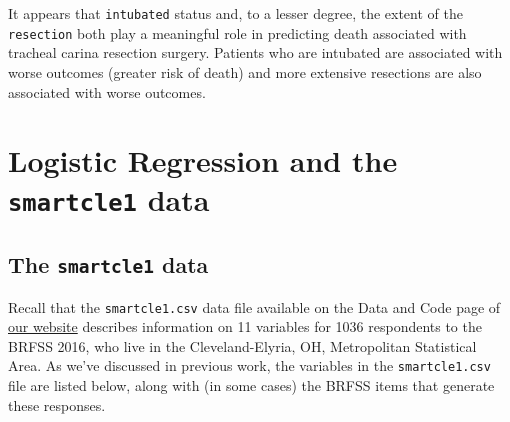 \documentclass[]{book}
\theoremstyle{definition}
\theoremstyle{definition}
\theoremstyle{definition}
\theoremstyle{remark}
\begin{document}
It appears that \texttt{intubated} status and, to a lesser degree, the
extent of the \texttt{resection} both play a meaningful role in
predicting death associated with tracheal carina resection surgery.
Patients who are intubated are associated with worse outcomes (greater
risk of death) and more extensive resections are also associated with
worse outcomes.

\chapter{\texorpdfstring{Logistic Regression and the \texttt{smartcle1}
data}{Logistic Regression and the smartcle1 data}}\label{logistic-regression-and-the-smartcle1-data}

\section{\texorpdfstring{The \texttt{smartcle1}
data}{The smartcle1 data}}\label{the-smartcle1-data}

Recall that the \texttt{smartcle1.csv} data file available on the Data
and Code page of \href{https://github.com/THOMASELOVE/432-2018}{our
website} describes information on 11 variables for 1036 respondents to
the BRFSS 2016, who live in the Cleveland-Elyria, OH, Metropolitan
Statistical Area. As we've discussed in previous work, the variables in
the \texttt{smartcle1.csv} file are listed below, along with (in some
cases) the BRFSS items that generate these responses.
\end{document}
